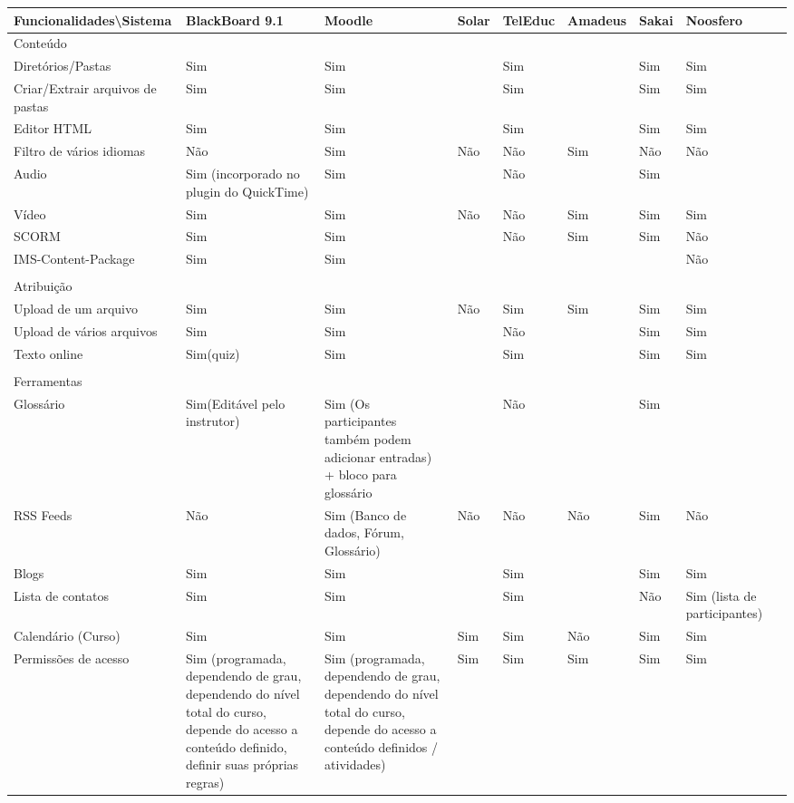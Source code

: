 \begin{table}[h]
\begin{tabular}{@{}lllllllll@{}}
\toprule
Funcionalidades\textbackslash Sistema & BlackBoard 9.1 & Moodle & Solar & TelEduc & Amadeus & Sakai & Noosfero &  \\ \midrule
Conteúdo &  &  &  &  &  &  &  &  \\
Diretórios/Pastas & Sim & Sim &  & Sim &  & Sim & Sim &  \\
Criar/Extrair arquivos de pastas & Sim & Sim &  & Sim &  & Sim & Sim &  \\
Editor HTML & Sim & Sim &  & Sim &  & Sim & Sim &  \\
Filtro de vários idiomas & Não & Sim & Não & Não & Sim & Não & Não &  \\
Audio & Sim (incorporado no plugin do QuickTime) & Sim &  & Não &  & Sim &  &  \\
Vídeo & Sim & Sim & Não & Não & Sim & Sim & Sim &  \\
SCORM & Sim & Sim &  & Não & Sim & Sim & Não &  \\
IMS-Content-Package & Sim & Sim &  &  &  &  & Não &  \\
 &  &  &  &  &  &  &  &  \\
Atribuição &  &  &  &  &  &  &  &  \\
Upload de um arquivo & Sim & Sim & Não & Sim & Sim & Sim & Sim &  \\
Upload de vários arquivos & Sim & Sim &  & Não &  & Sim & Sim &  \\
Texto online & Sim(quiz) & Sim &  & Sim &  & Sim & Sim &  \\
 &  &  &  &  &  &  &  &  \\
Ferramentas &  &  &  &  &  &  &  &  \\
Glossário & Sim(Editável pelo instrutor) & Sim (Os participantes também podem adicionar entradas) + bloco para glossário &  & Não &  & Sim &  &  \\
RSS Feeds & Não & Sim (Banco de dados, Fórum, Glossário) & Não & Não & Não & Sim & Não &  \\
Blogs & Sim & Sim &  & Sim &  & Sim & Sim &  \\
Lista de contatos & Sim & Sim &  & Sim &  & Não & Sim (lista de participantes) &  \\
Calendário (Curso) & Sim & Sim & Sim & Sim & Não & Sim & Sim &  \\
Permissões de acesso & Sim (programada, dependendo de grau, dependendo do nível total do curso, depende do acesso a conteúdo definido, definir suas próprias regras) & Sim (programada, dependendo de grau, dependendo do nível total do curso, depende do acesso a conteúdo definidos / atividades) & Sim & Sim & Sim & Sim & Sim &  \\

\end{tabular}
\end{table}

